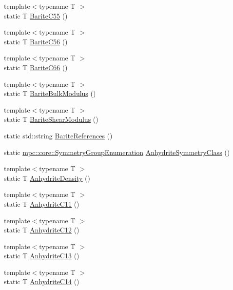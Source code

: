 \begin{DoxyCompactItemize}
\item 
{\footnotesize template$<$typename T $>$ }\\static T \mbox{\hyperlink{namespacempc_1_1data_a715fea7ff514bedfe0a4af3999b867cf}{Barite\+C55}} ()
\item 
{\footnotesize template$<$typename T $>$ }\\static T \mbox{\hyperlink{namespacempc_1_1data_ae6b440901e6b5234e7eeb9021c542042}{Barite\+C56}} ()
\item 
{\footnotesize template$<$typename T $>$ }\\static T \mbox{\hyperlink{namespacempc_1_1data_afd358dfd99022852d6d70322c9348afd}{Barite\+C66}} ()
\item 
{\footnotesize template$<$typename T $>$ }\\static T \mbox{\hyperlink{namespacempc_1_1data_a99ca11695e7e2a29954bc7a46be5c11b}{Barite\+Bulk\+Modulus}} ()
\item 
{\footnotesize template$<$typename T $>$ }\\static T \mbox{\hyperlink{namespacempc_1_1data_aad72eac174ca49c18334f20df5179100}{Barite\+Shear\+Modulus}} ()
\item 
static std\+::string \mbox{\hyperlink{namespacempc_1_1data_aeddefaf0026586312d9986804d253a69}{Barite\+References}} ()
\item 
static \mbox{\hyperlink{namespacempc_1_1core_a9d979684062547055a0ef5c13077bad8}{mpc\+::core\+::\+Symmetry\+Group\+Enumeration}} \mbox{\hyperlink{namespacempc_1_1data_adc76212838b1323105fb76b188100224}{Anhydrite\+Symmetry\+Class}} ()
\item 
{\footnotesize template$<$typename T $>$ }\\static T \mbox{\hyperlink{namespacempc_1_1data_a31601a808bf405923e686608708d3eaa}{Anhydrite\+Density}} ()
\item 
{\footnotesize template$<$typename T $>$ }\\static T \mbox{\hyperlink{namespacempc_1_1data_a575797fd9c77fd02adb9a4e8b382b35d}{Anhydrite\+C11}} ()
\item 
{\footnotesize template$<$typename T $>$ }\\static T \mbox{\hyperlink{namespacempc_1_1data_a90f9bb38e64763dfc8d92e1ec12e23dc}{Anhydrite\+C12}} ()
\item 
{\footnotesize template$<$typename T $>$ }\\static T \mbox{\hyperlink{namespacempc_1_1data_a27dca2248dc930c663f1ed42f5eaf4b8}{Anhydrite\+C13}} ()
\item 
{\footnotesize template$<$typename T $>$ }\\static T \mbox{\hyperlink{namespacempc_1_1data_a0dfb46d63acc9b3c6bbab6c08284b435}{Anhydrite\+C14}} ()

\end{DoxyCompactItemize}
